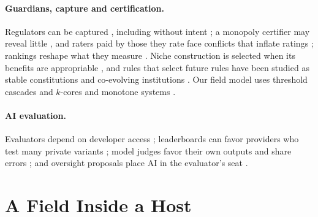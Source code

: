 \documentclass[letterpaper]{article} %
\theoremstyle{definition}
\begin{document}
\paragraph{Guardians, capture and certification.} Regulators can be captured \citep{stigler1971,laffont1991,dalbo2006,carpenter2013}, including without intent \citep{kwak2014}; a monopoly certifier may reveal little \citep{lizzeri1999}, and raters paid by those they rate face conflicts that inflate ratings \citep{bolton2012}; rankings reshape what they measure \citep{espeland2007,campbell1979,manheim2018}. Niche construction is selected when its benefits are appropriable \citep{krakauer2009,lehmann2008,gerlee2015,teece1986}, and rules that select future rules have been studied as stable constitutions and co-evolving institutions \citep{barbera2004,acemoglu2012,bowles2003,campbell1974}. Our field model uses threshold cascades and $k$-cores \citep{granovetter1978,morris2000,kempe2003,seidman1983} and monotone systems \citep{hirsch1985,smith1995}.

\paragraph{AI evaluation.} Evaluators depend on developer access \citep{longpre2024}; leaderboards can favor providers who test many private variants \citep{singh2025}; model judges favor their own outputs \citep{panickssery2024} and share errors \citep{kim2025,goel2025}; and oversight proposals place AI in the evaluator's seat \citep{irving2018,christiano2018,leike2018,bai2022,burns2024,greenblatt2024}.

\section{A Field Inside a Host}\label{sec:model}
\end{document}

